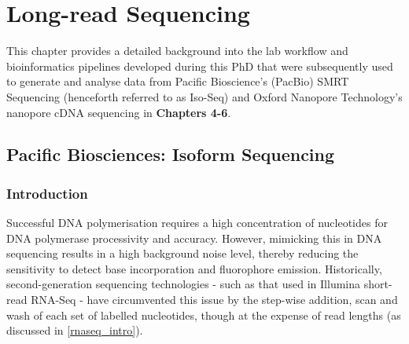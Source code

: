 \chapter{Long-read Sequencing}\label{ch: long_read_sequencing}

This chapter provides a detailed background into the lab workflow and bioinformatics pipelines developed during this PhD that were subsequently used to generate and analyse data from Pacific Bioscience's (PacBio) SMRT Sequencing (henceforth referred to as Iso-Seq) and Oxford Nanopore Technology's nanopore cDNA sequencing in \textbf{Chapters 4-6}. 

\section{Pacific Biosciences: Isoform Sequencing}
\label{sec:pb_isoform_sequencing}

\subsection{Introduction}
Successful DNA polymerisation requires a high concentration of nucleotides for DNA polymerase processivity and accuracy. However, mimicking this in DNA sequencing results in a high background noise level, thereby reducing the sensitivity to detect base incorporation and fluorophore emission. Historically, second-generation sequencing technologies - such as that used in Illumina short-read RNA-Seq - have circumvented this issue by the step-wise addition, scan and wash of each set of labelled nucleotides, though at the expense of read lengths (as discussed in \cref{rnaseq_intro}). 

